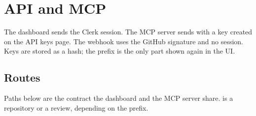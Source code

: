 \chapter{API and MCP}
\label{chap:api}

The dashboard sends the Clerk session. The MCP server sends  with a key created on the API keys page. The webhook uses the GitHub signature and no session. Keys are stored as a hash; the  prefix is the only part shown again in the UI.

\section{Routes}

Paths below are the contract the dashboard and the MCP server share.  is a repository or a review, depending on the prefix.

